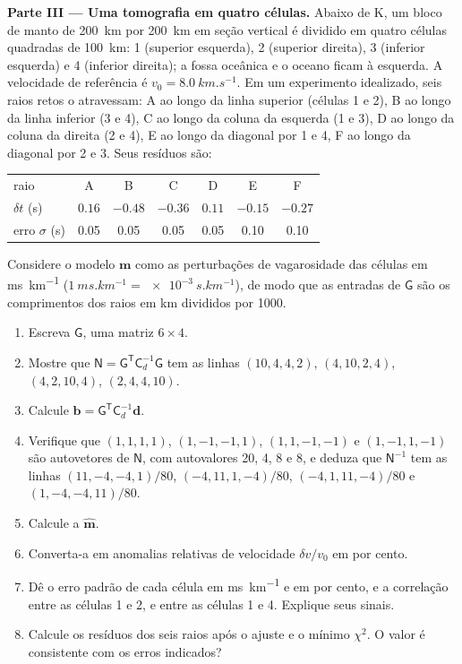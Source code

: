 \begin{problem}
\noindent\textbf{Parte III --- Uma tomografia em quatro células.} Abaixo de K, um bloco de
manto de \qty{200}{km} por \qty{200}{km} em seção vertical é dividido em quatro
células quadradas de \qty{100}{km}: 1 (superior esquerda), 2 (superior direita), 3 (inferior esquerda)
e 4 (inferior direita); a fossa oceânica e o oceano ficam à esquerda. A velocidade de referência é $v_0 = \qty{8.0}{km.s^{-1}}$. Em um
experimento idealizado, seis raios retos o atravessam: A ao longo da linha superior (células 1
e 2), B ao longo da linha inferior (3 e 4), C ao longo da coluna da esquerda (1 e 3), D
ao longo da coluna da direita (2 e 4), E ao longo da diagonal por 1 e 4, F ao longo
da diagonal por 2 e 3. Seus resíduos são:
\begin{center}
\small
\begin{tabular}{lcccccc}
\hline
raio & A & B & C & D & E & F \\
$\delta t$ (\unit{s}) & $0.16$ & $-0.48$ & $-0.36$ & $0.11$ & $-0.15$ & $-0.27$ \\
erro $\sigma$ (\unit{s}) & 0.05 & 0.05 & 0.05 & 0.05 & 0.10 & 0.10 \\
\hline
\end{tabular}
\end{center}
Considere o modelo $\mathbf m$ como as perturbações de vagarosidade das células em
\unit{ms.km^{-1}} ($\qty{1}{ms.km^{-1}} = \qty{e-3}{s.km^{-1}}$), de modo que as
entradas de $\mathsf G$ são os comprimentos dos raios em \unit{km} divididos por 1000.
\begin{enumerate}[resume]
  \item Escreva $\mathsf G$, uma matriz $6\times4$.
  \item Mostre que $\mathsf N = \mathsf G^{\mathsf T}\mathsf C_d^{-1}\mathsf G$
        tem as linhas $(10, 4, 4, 2)$, $(4, 10, 2, 4)$, $(4, 2, 10, 4)$,
        $(2, 4, 4, 10)$.
  \item Calcule $\mathbf b = \mathsf G^{\mathsf T}\mathsf C_d^{-1}\mathbf d$.
  \item Verifique que $(1,1,1,1)$, $(1,-1,-1,1)$, $(1,1,-1,-1)$ e $(1,-1,1,-1)$
        são autovetores de $\mathsf N$, com autovalores 20, 4, 8 e 8, e
        deduza que $\mathsf N^{-1}$ tem as linhas $(11, -4, -4, 1)/80$,
        $(-4, 11, 1, -4)/80$, $(-4, 1, 11, -4)/80$ e $(1, -4, -4, 11)/80$.
  \item Calcule a  $\hat{\mathbf m}$.
  \item Converta-a em anomalias relativas de velocidade $\delta v/v_0$ em por cento.
  \item Dê o erro padrão de cada célula em \unit{ms.km^{-1}} e em por
        cento, e a correlação entre as células 1 e 2, e entre as células 1
        e 4. Explique seus sinais.
  \item Calcule os resíduos dos seis raios após o ajuste e o
        mínimo $\chi^2$. O valor é consistente com os erros indicados?
\end{enumerate}


\end{problem}
